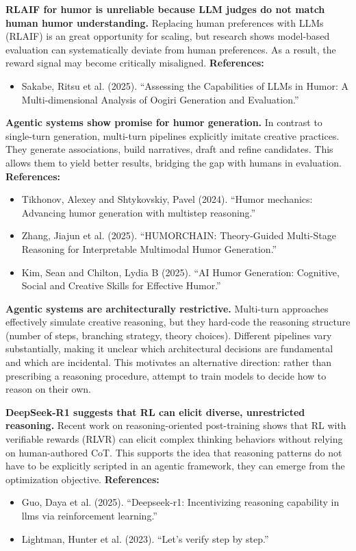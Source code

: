 \documentclass[12pt]{extarticle}
\begin{document}
\textbf{RLAIF for humor is unreliable because LLM judges do not match human humor understanding.} Replacing human preferences with LLMs (RLAIF) is an great opportunity for scaling, but research shows model-based evaluation can systematically deviate from human preferences. As a result, the reward signal may become critically misaligned.
\textbf{References:}
\begin{itemize}[leftmargin=1.5em]
  \item Sakabe, Ritsu et al. (2025). ``Assessing the Capabilities of LLMs in Humor: A Multi-dimensional Analysis of Oogiri Generation and Evaluation.''
\end{itemize}

\textbf{Agentic systems show promise for humor generation.} In contrast to single-turn generation, multi-turn pipelines explicitly imitate creative practices. They generate associations, build narratives, draft and refine candidates. This allows them to yield better results, bridging the gap with humans in evaluation.
\textbf{References:}
\begin{itemize}[leftmargin=1.5em]
  \item Tikhonov, Alexey and Shtykovskiy, Pavel (2024). ``Humor mechanics: Advancing humor generation with multistep reasoning.''
  \item Zhang, Jiajun et al. (2025). ``HUMORCHAIN: Theory-Guided Multi-Stage Reasoning for Interpretable Multimodal Humor Generation.''
  \item Kim, Sean and Chilton, Lydia B (2025). ``AI Humor Generation: Cognitive, Social and Creative Skills for Effective Humor.''
\end{itemize}

\textbf{Agentic systems are architecturally restrictive.} Multi-turn approaches effectively simulate creative reasoning, but they hard-code the reasoning structure (number of steps, branching strategy, theory choices). Different pipelines vary substantially, making it unclear which architectural decisions are fundamental and which are incidental. This motivates an alternative direction: rather than prescribing a reasoning procedure, attempt to train models to decide how to reason on their own.

\textbf{DeepSeek-R1 suggests that RL can elicit diverse, unrestricted reasoning.} Recent work on reasoning-oriented post-training shows that RL with verifiable rewards (RLVR) can elicit complex thinking behaviors without relying on human-authored CoT. This supports the idea that reasoning patterns do not have to be explicitly scripted in an agentic framework, they can emerge from the optimization objective.
\textbf{References:}
\begin{itemize}[leftmargin=1.5em]
  \item Guo, Daya et al. (2025). ``Deepseek-r1: Incentivizing reasoning capability in llms via reinforcement learning.''
  \item Lightman, Hunter et al. (2023). ``Let's verify step by step.''
\end{itemize}
\end{document}
